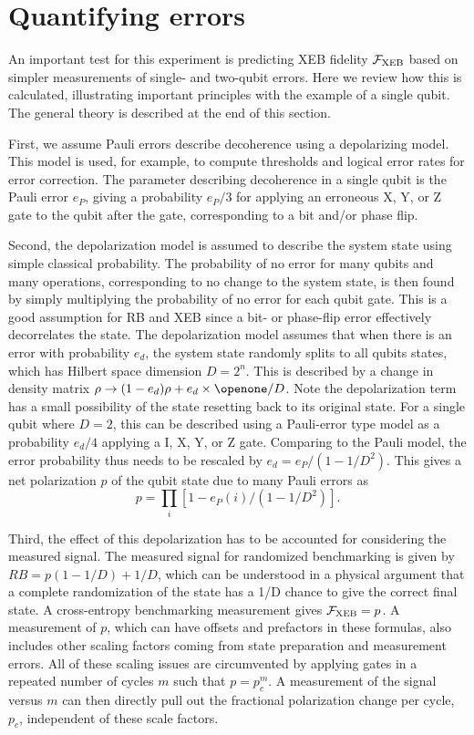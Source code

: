 \section{Quantifying errors}\label{sec:computing_errors}

An important test for this experiment is predicting XEB fidelity $\mathcal{F}_{\text{XEB}}$ based on simpler measurements of single- and two-qubit errors.  Here we review how this is calculated, illustrating important principles with the example of a single qubit.  The general theory is described at the end of this section.  

First, we assume Pauli errors describe decoherence using a depolarizing model.  This model is used, for example, to compute thresholds and logical error rates for error correction.  The parameter describing decoherence in a single qubit is the Pauli error $e_P$, giving a probability $e_P/3$ for applying an erroneous X, Y, or Z gate to the qubit after the gate, corresponding to a bit and/or phase flip. 

Second, the depolarization model is assumed to describe the system state using simple classical probability.  The probability of no error for many qubits and many operations, corresponding to no change to the system state, is then found by simply multiplying the probability of no error for each qubit gate.  This is a good assumption for RB and XEB since a bit- or phase-flip error effectively decorrelates the state.  The depolarization model assumes that when there is an error with probability $e_d$, the system state randomly splits to all qubits states, which has Hilbert space dimension $D=2^n$.  This is described by a change in density matrix $\rho \rightarrow (1-e_d)\rho + e_d\times \openone/D$.  Note the depolarization term has a small possibility of the state resetting back to its original state.  For a single qubit where $D=2$, this can be described using a Pauli-error type model as a probability $e_d/4$ applying a I, X, Y, or Z gate.  Comparing to the Pauli model, the error probability thus needs to be rescaled by $e_d = e_P/(1-1/D^2)$.  This gives a net polarization $p$ of the qubit state due to many Pauli errors as 
\begin{equation}\label{eq:error_prod}
p=\prod_i \left[1-e_P(i)/\left(1-1/D^2\right)\right]. 
\end{equation} 

Third, the effect of this depolarization has to be accounted for considering the measured signal.   The measured signal for randomized benchmarking is given by $RB = p(1-1/D) + 1/D$, which can be understood in a physical argument that a complete randomization of the state has a 1/D chance to give the correct final state.  A cross-entropy benchmarking measurement gives $\mathcal{F}_{\text{XEB}} = p$.  A measurement of $p$, which can have offsets and prefactors in these formulas, also includes other scaling factors coming from state preparation and measurement errors.  All of these scaling issues are circumvented by applying gates in a repeated number of cycles $m$ such that $p=p_c^m$.  A measurement of the signal versus $m$ can then directly pull out the fractional polarization change per cycle, $p_c$, independent of these scale factors.  

